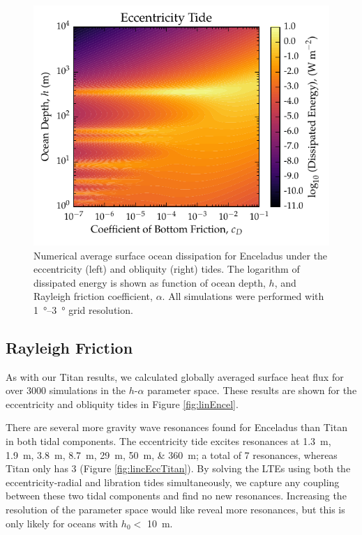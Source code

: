 \begin{figure}[!h]
    \centering
    \includegraphics[width=\linewidth]{Figures/enceladus_bottom}
\caption{Numerical average surface ocean dissipation for Enceladus under the eccentricity (left) and obliquity (right) tides. The logarithm of dissipated energy is shown as function of ocean depth, $h$, and Rayleigh friction coefficient, $\alpha$. All simulations were performed with \SIrange{1}{3}{\degree} grid resolution. \label{fig:botEncel}}
\end{figure}

\subsection{Rayleigh Friction}

As with our Titan results, we calculated globally averaged surface heat flux for over 3000 simulations in the $h$-$\alpha$ parameter space. These results are shown for the eccentricity and obliquity tides in Figure \ref{fig:linEncel}.

There are several more gravity wave resonances found for Enceladus than Titan in both tidal components. The eccentricity tide excites resonances at \SIlist{1.3;1.9;3.8;8.7;29;50;360}{m}; a total of 7 resonances, whereas Titan only has 3 (Figure \ref{fig:lincEccTitan}). By solving the LTEs using both the eccentricity-radial and libration tides simultaneously, we capture any coupling between these two tidal components and find no new resonances. Increasing the resolution of the parameter space would like reveal more resonances, but this is only likely for oceans with $h_0 <$ \SI{10}{\metre}. 

